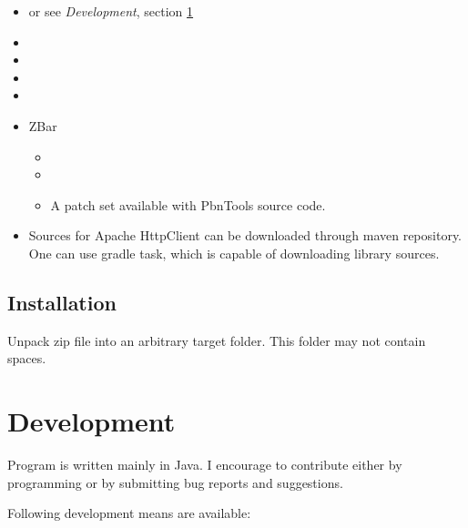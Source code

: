 \documentclass[polish,a4paper,11pt,oneside]{article}
\begin{document}
\begin{itemize}
\item
  \pbntoolsSourceLinks
  or see {\em Development}, section \ref{dev}
\item
\item
  \jsoupSourceLinks
\item
  \kotlinSourceLinks
\item
  \logbackSourceLinks
\item
  ZBar
  \begin{itemize}
  \item
    \zbarOldOrigSourceLinks
  \item
    \zbarOldSourceLinks
  \item
    A patch set available with PbnTools source code.
  \end{itemize}

\item

Sources for Apache HttpClient can be downloaded through maven repository.
One can use gradle task, which is capable of downloading library sources.

\end{itemize}

\subsection{Installation}
Unpack zip file into an arbitrary target folder.
This folder may not contain spaces.

\section{Development} \label{dev}

Program is written mainly in Java.
I encourage to contribute either by programming or by submitting bug reports and suggestions.

Following development means are available:
\end{document}
